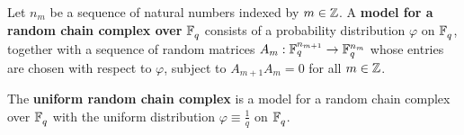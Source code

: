 


\begin{definition}
  Let $n_m$ be a sequence of natural numbers indexed by $m \in \mathbb{Z}$.  A {\bf
  model for a random chain complex over} $\mathbb{F}_q^{}$ consists of a probability
  distribution $\varphi$ on $\mathbb{F}_q^{}$, together with a sequence of random matrices
  $A_m: \mathbb{F}_q^{n_{m+1}} \rightarrow \mathbb{F}_q^{n_m}$ whose entries are chosen with respect to
  $\varphi$, subject to $A_{m+1}A_m = 0$ for all $m \in \mathbb{Z}$.
\end{definition}


\begin{definition}
  The {\bf uniform random chain complex} is a model for a random chain complex
  over $\mathbb{F}_q^{}$ with the uniform distribution $\varphi \equiv \tfrac1q$ on $\mathbb{F}_q^{}$. 
  \label{defn:random_chain_cx}
\end{definition}



